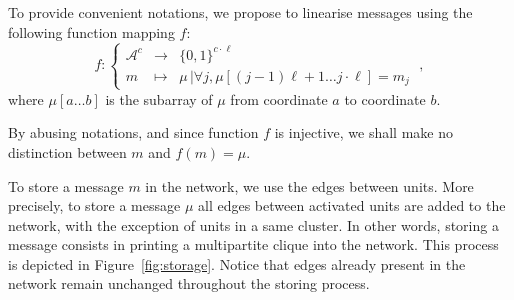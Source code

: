 \documentclass[english,10pt,twocolumn]{IEEEtran}
\renewcommand{\le}{\leqslant}
\theoremstyle{definition}
\begin{document}
	To provide convenient notations, we propose to linearise messages using the following function mapping $f$:
\[
f: \left\{\begin{array}{rcl}\mathcal{A}^c &\rightarrow& \{0,1\}^{c\cdot{} \ell}\\m&\mapsto& \mu \,\big| \forall j, \mu[(j-1)\ell+1\dots j\cdot \ell] = m_j\end{array}\right.\;,
\]
where $\mu[a\dots b]$ is the subarray of $\mu$ from coordinate $a$ to coordinate $b$.

By abusing notations, and since function $f$ is injective, we shall make no distinction between $m$ and $f(m)=\mu$.
	
	
	To store a message $m$ in the network, we use the edges between units. More precisely, to store a message $\mu$ all edges between activated units are added to the network, with the exception of units in a same cluster. In other words, storing a message consists in printing a multipartite clique into the network. This process is depicted in Figure~\ref{fig:storage}. %
        Notice that edges already present in the network remain unchanged throughout the storing process. %
\end{document}
